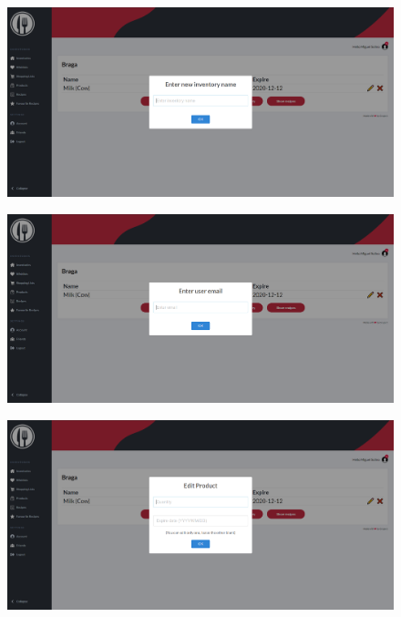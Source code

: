 \documentclass[a4paper]{report}
\begin{document}
    \begin{figure}[H]
        \centering
            \includegraphics[width=\textwidth]{images/produto_final/alterar_nome_iventario.png}
    \end{figure}

    \begin{figure}[H]
        \centering
            \includegraphics[width=\textwidth]{images/produto_final/partilhar_com_outro_utilizador.png}
    \end{figure}

    \begin{figure}[H]
        \centering
            \includegraphics[width=\textwidth]{images/produto_final/editar_produto.png}
    \end{figure}
\end{document}
